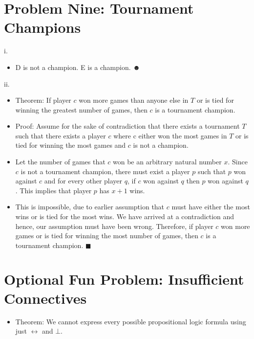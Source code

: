 \documentclass{article}
\renewcommand{\(}{\left(}
\renewcommand{\)}{\right)}
\theoremstyle{plain}
\theoremstyle{plain}
\theoremstyle{definition}
\begin{document}
\newpage

\section*{Problem Nine: Tournament Champions}
    i.
    \begin{shaded}
        \begin{itemize}
            \item 
                D is not a champion. E is a champion. $\blacksmiley$
        \end{itemize}
    \end{shaded}
    
    ii.
    \begin{shaded}
        \begin{itemize}
            \item 
                Theorem: If player $c$ won more games than anyone else in $T$ or is tied for winning the greatest number of games, then $c$ is a tournament champion.
            \item
                Proof: Assume for the sake of contradiction that there exists a tournament $T$ such that there exists a player $c$ where c either won the most games in $T$ or is tied for winning the most games and $c$ is not a champion.
            \item 
                Let the number of games that $c$ won be an arbitrary natural number $x$. 
                Since $c$ is not a tournament champion, there must exist a player $p$ such that $p$ won against $c$ and for every other player $q$, if $c$ won against $q$ then $p$ won against $q$. This implies that player $p$ has $x+1$ wins.
            \item
                This is impossible, due to earlier assumption that $c$ must have either the most wins or is tied for the most wins. We have arrived at a contradiction and hence, our assumption must have been wrong. Therefore, if player $c$ won more games or is tied for winning the most number of games, then $c$ is a tournament champion. $\blacksquare$
        \end{itemize}
    \end{shaded}
    
\newpage

\section*{Optional Fun Problem: Insufficient Connectives}

\begin{shaded}
    \begin{itemize}
        \item 
            Theorem: We cannot express every possible propositional logic formula using just $\leftrightarrow$ and $\bot$.
    \end{itemize}
\end{shaded}
    
\end{document}
